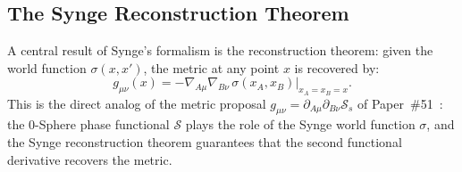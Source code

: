 \documentclass[%
 reprint, amsmath,amssymb, aps, prd, ]{revtex4-2}
\numberwithin{equation}{section}
\newcommand{\SyngeS}{\mathcal{S}}
\begin{document}
\subsection{The Synge Reconstruction Theorem}

A central result of Synge's formalism is the reconstruction theorem: given the world function $\sigma(x,x')$, the metric at any point $x$ is recovered by:
\begin{equation}
g_{\mu\nu}(x) = -\nabla_{A\mu}\nabla_{B\nu}\,\sigma(x_A,x_B)\big|_{x_A = x_B = x}.
\label{app:eq:reconstruction}
\end{equation}
This is the direct analog of the metric proposal $g_{\mu\nu} = \partial_{A\mu}\partial_{B\nu}\SyngeS_s$ of Paper~\#51~\cite{hanamura51}: the 0-Sphere phase functional $\SyngeS$ plays the role of the Synge world function $\sigma$, and the Synge reconstruction theorem guarantees that the second functional derivative recovers the metric.
\end{document}
